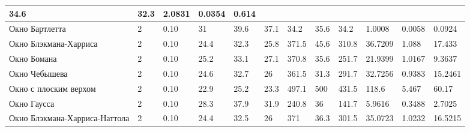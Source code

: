 {\begin{longtable}{|L{3.35cm}|C{0.65cm}|C{0.85cm}|C{1.10cm}|C{1.10cm}|C{1.30cm}|C{0.95cm}|C{0.95cm}|C{1.10cm}|C{1.45cm}|C{1.35cm}|C{1.40cm}|}
34.6 & %
32.3 & %
2.0831 & %
0.0354 & %
0.614 \\
\hline
Окно Бартлетта & %
2 & %
0.10 & %
31 & %
39.6 & %
37.1 & %
34.2 & %
35.6 & %
34.2 & %
1.0008 & %
0.0058 & %
0.0924 \\
\hline
Окно Блэкмана-Харриса & %
2 & %
0.10 & %
24.4 & %
32.3 & %
25.8 & %
371.5 & %
45.6 & %
310.8 & %
36.7209 & %
1.088 & %
17.433 \\
\hline
Окно Бомана & %
2 & %
0.10 & %
25.2 & %
33.1 & %
27.1 & %
370.8 & %
35.6 & %
251.7 & %
21.9399 & %
1.0167 & %
9.3637 \\
\hline
Окно Чебышева & %
2 & %
0.10 & %
24.6 & %
32.7 & %
26 & %
361.5 & %
31.3 & %
291.7 & %
32.7256 & %
0.9383 & %
15.2461 \\
\hline
Окно с плоским верхом & %
2 & %
0.10 & %
22.9 & %
25.2 & %
23.3 & %
497.1 & %
500 & %
431.5 & %
118.6 & %
5.467 & %
60.17 \\
\hline
Окно Гаусса & %
2 & %
0.10 & %
28.3 & %
37.9 & %
31.9 & %
240.8 & %
36 & %
141.7 & %
5.9616 & %
0.3488 & %
2.7025 \\
\hline
Окно Блэкмана-Харриса-Наттола & %
2 & %
0.10 & %
24.4 & %
32.5 & %
26 & %
371 & %
36.3 & %
301.5 & %
35.0723 & %
1.0232 & %
16.5215 \\

\end{longtable}}
